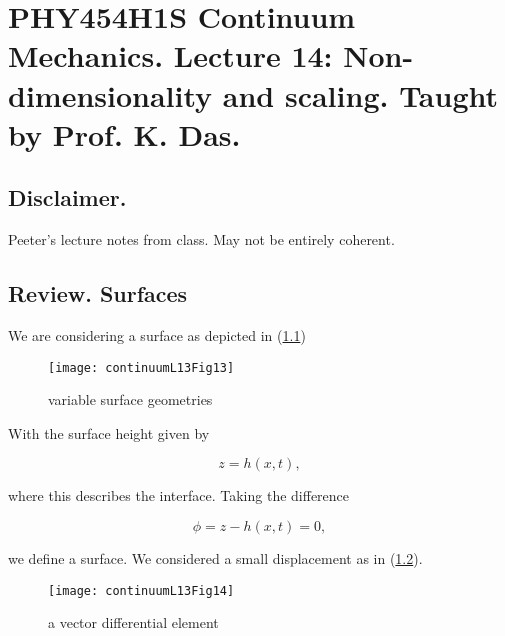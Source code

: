 
%

\chapter{PHY454H1S Continuum Mechanics.  Lecture 14: Non-dimensionality and scaling.  Taught by Prof. K. Das.}
\label{chap:continuumL14}
{}
\date{Mar 7, 2012}

\beginArtWithToc

\section{Disclaimer.}

Peeter's lecture notes from class.  May not be entirely coherent.

\section{Review.  Surfaces}

We are considering a surface as depicted in (\ref{fig:continuumL14:continuumL14Fig13})

\begin{figure}[htp]
   \centering
   \texttt{[image: continuumL13Fig13]}
   \caption{variable surface geometries}\label{fig:continuumL14:continuumL14Fig13}
\end{figure}

With the surface height given by

\begin{equation}\label{eqn:continuumL14:10}
z = h(x, t),
\end{equation}

where this describes the interface.  Taking the difference

\begin{equation}\label{eqn:continuumL14:30}
\phi = z - h(x, t) = 0,
\end{equation}

we define a surface.  We considered a small displacement as in (\ref{fig:continuumL14:continuumL14Fig14}).

\begin{figure}[htp]
   \centering
   \texttt{[image: continuumL13Fig14]}
   \caption{a vector differential element}\label{fig:continuumL14:continuumL14Fig14}
\end{figure}

